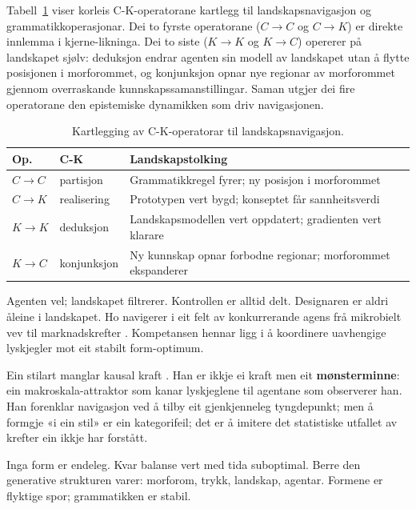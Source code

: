 Tabell~\ref{tab:ck-mapping} viser korleis C-K-operatorane kartlegg til landskapsnavigasjon og grammatikkoperasjonar. Dei to fyrste operatorane ($C \to C$ og $C \to K$) er direkte innlemma i kjerne-likninga. Dei to siste ($K \to K$ og $K \to C$) opererer på landskapet sjølv: deduksjon endrar agenten sin modell av landskapet utan å flytte posisjonen i morforommet, og konjunksjon opnar nye regionar av morforommet gjennom overraskande kunnskapssamanstillingar. Saman utgjer dei fire operatorane den epistemiske dynamikken som driv navigasjonen.

\begin{table}[!t]
\centering
\caption{Kartlegging av C-K-operatorar til landskapsnavigasjon.}
\label{tab:ck-mapping}
\small
\begin{tabularx}{\columnwidth}{@{}l l >{\raggedright\arraybackslash}X@{}}
\toprule
\textbf{Op.} & \textbf{C-K} & \textbf{Landskapstolking} \\
\midrule
$C \!\to\! C$ & partisjon & Grammatikkregel fyrer; ny posisjon i morforommet \\[2pt]
$C \!\to\! K$ & realisering & Prototypen vert bygd; konseptet får sannheitsverdi \\[2pt]
$K \!\to\! K$ & deduksjon & Landskapsmodellen vert oppdatert; gradienten vert klarare \\[2pt]
$K \!\to\! C$ & konjunksjon & Ny kunnskap opnar forbodne regionar; morforommet ekspanderer \\
\bottomrule
\end{tabularx}
\end{table}

Agenten vel; landskapet filtrerer. Kontrollen er alltid delt. Designaren er aldri åleine i landskapet. Ho navigerer i eit felt av konkurrerande agens frå mikrobielt vev til marknadskrefter \parencite{Levin2022}. Kompetansen hennar ligg i å koordinere uavhengige lyskjegler mot eit stabilt form-optimum.

Ein stilart manglar kausal kraft \parencite{Kubler1962, Michl1995}. Han er ikkje ei kraft men eit \textbf{mønsterminne}: ein makroskala-attraktor som kanar lyskjeglene til agentane som observerer han. Han forenklar navigasjon ved å tilby eit gjenkjenneleg tyngdepunkt; men å formgje «i ein stil» er ein kategorifeil; det er å imitere det statistiske utfallet av krefter ein ikkje har forstått.

Inga form er endeleg. Kvar balanse vert med tida suboptimal. Berre den generative strukturen varer: morforom, trykk, landskap, agentar. Formene er flyktige spor; grammatikken er stabil.

